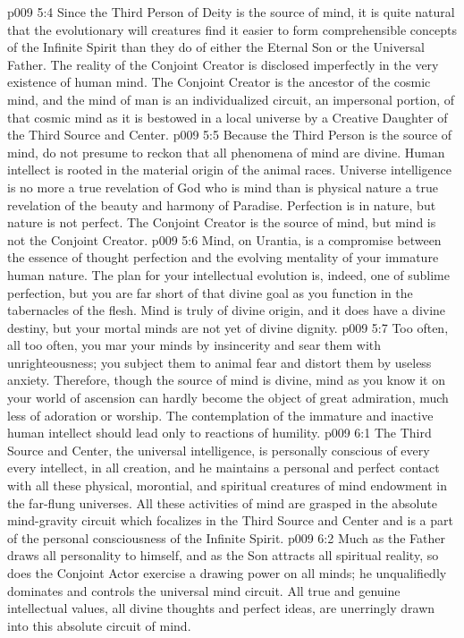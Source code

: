 \pc \vs p009 5:4 Since the Third Person of Deity is the source of mind, it is quite natural that the evolutionary will creatures find it easier to form comprehensible concepts of the Infinite Spirit than they do of either the Eternal Son or the Universal Father. The reality of the Conjoint Creator is disclosed imperfectly in the very existence of human mind. The Conjoint Creator is the ancestor of the cosmic mind, and the mind of man is an individualized circuit, an impersonal portion, of that cosmic mind as it is bestowed in a local universe by a Creative Daughter of the Third Source and Center.
\pc \vs p009 5:5 Because the Third Person is the source of mind, do not presume to reckon that all phenomena of mind are divine. Human intellect is rooted in the material origin of the animal races. Universe intelligence is no more a true revelation of God who is mind than is physical nature a true revelation of the beauty and harmony of Paradise. Perfection is in nature, but nature is not perfect. The Conjoint Creator is the source of mind, but mind is not the Conjoint Creator.
\vs p009 5:6 Mind, on Urantia, is a compromise between the essence of thought perfection and the evolving mentality of your immature human nature. The plan for your intellectual evolution is, indeed, one of sublime perfection, but you are far short of that divine goal as you function in the tabernacles of the flesh. Mind is truly of divine origin, and it does have a divine destiny, but your mortal minds are not yet of divine dignity.
\vs p009 5:7 Too often, all too often, you mar your minds by insincerity and sear them with unrighteousness; you subject them to animal fear and distort them by useless anxiety. Therefore, though the source of mind is divine, mind as you know it on your world of ascension can hardly become the object of great admiration, much less of adoration or worship. The contemplation of the immature and inactive human intellect should lead only to reactions of humility.\plusone
{}
\vs p009 6:1 The Third Source and Center, the universal intelligence, is personally conscious of every  every intellect, in all creation, and he maintains a personal and perfect contact with all these physical, morontial, and spiritual creatures of mind endowment in the far\hyp{}flung universes. All these activities of mind are grasped in the absolute mind\hyp{}gravity circuit which focalizes in the Third Source and Center and is a part of the personal consciousness of the Infinite Spirit.
\vs p009 6:2 Much as the Father draws all personality to himself, and as the Son attracts all spiritual reality, so does the Conjoint Actor exercise a drawing power on all minds; he unqualifiedly dominates and controls the universal mind circuit. All true and genuine intellectual values, all divine thoughts and perfect ideas, are unerringly drawn into this absolute circuit of mind.
